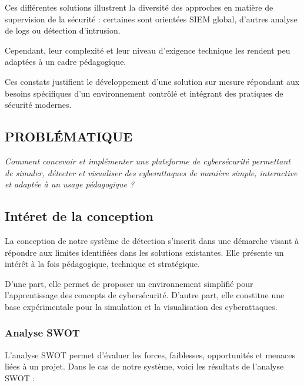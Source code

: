\documentclass[a4paper,12pt]{report}
\begin{document}
    Ces différentes solutions illustrent la diversité des approches en matière de supervision de la sécurité : certaines sont orientées SIEM global, d’autres analyse de logs ou détection d’intrusion.   
    
    Cependant, leur complexité et leur niveau d’exigence technique les rendent peu adaptées à un cadre pédagogique.
    
    Ces constats justifient le développement d’une solution sur mesure répondant aux besoins spécifiques d'un environnement contrôlé et intégrant des pratiques de sécurité modernes.
    
    \subsection{PROBLÉMATIQUE}
    
    \begin{center}
        \textit{Comment concevoir et implémenter une plateforme de cybersécurité permettant de simuler, détecter et visualiser des cyberattaques de manière simple, interactive et adaptée à un usage pédagogique ?}
    \end{center}
    
    \subsection{Intéret de la conception}
    
    La conception de notre système de détection s’inscrit dans une démarche visant à répondre aux limites identifiées dans les solutions existantes. Elle présente un intérêt à la fois pédagogique, technique et stratégique.
    
    D’une part, elle permet de proposer un environnement simplifié pour l’apprentissage des concepts de cybersécurité. D’autre part, elle constitue une base expérimentale pour la simulation et la visualisation des cyberattaques.
    
    \subsubsection{Analyse SWOT}
    
    L’analyse SWOT permet d’évaluer les forces, faiblesses, opportunités et menaces liées à un projet. Dans le cas de notre système, voici les résultats de l'analyse SWOT :
    
\end{document}
